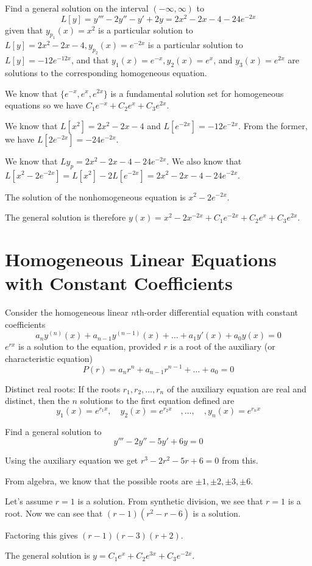 \documentclass[../diffeq.tex]{subfiles}
\begin{document}
\begin{example}
    Find a general solution on the interval $(-\infty,\infty)$ to 
    \[ L[y]=y'''-2y''-y'+2y=2x^2-2x-4-24e^{-2x}\]
    given that $y_{p_1}(x)=x^2$ is a particular solution to $L[y]=2x^2-2x-4, y_{p_2}(x)=e^{-2x}$ is a particular solution to $L[y]=-12e^{-12x}$, and that $y_1(x)=e^{-x},y_2(x)=e^x$, and $y_3(x)=e^{2x}$ are solutions to the corresponding homogeneous equation.

    We know that $\{e^{-x},e^x,e^{2x}\}$ is a fundamental solution set for homogeneous equations so we have $C_1e^{-x}+C_2e^x+C_3e^{2x}$.

    We know that $L[x^2]=2x^2-2x-4$ and $L[e^{-2x}]=-12e^{-2x}$. From the former, we have $L[2e^{-2x}]=-24e^{-2x}$.

    We know that $L{y_p}=2x^2-2x-4-24e^{-2x}$. We also know that $L[x^2-2e^{-2x}]=L[x^2]-2L[e^{-2x}]=2x^2-2x-4-24e^{-2x}$.

    The solution of the nonhomogeneous equation is $x^2-2e^{-2x}$.

    The general solution is therefore $y(x)=x^2-2x^{-2x}+C_1e^{-2x}+C_2e^x+C_3e^{2x}$.
\end{example}

\section{Homogeneous Linear Equations with Constant Coefficients}
Consider the homogeneous linear $n$th-order differential equation with constant coefficients 
\[ a_ny^{(n)}(x)+a_{n-1}y^{(n-1)}(x)+\dots + a_1y'(x)+a_0y(x)=0 \]
$e^{rx}$ is a solution to the equation, provided $r$ is a root of the auxiliary (or characteristic equation)
\[ P(r)=a_nr^n+a_{n-1}r^{n-1}+\dots+a_0 =0 \]

Distinct real roots: If the roots $r_1,r_2,\dots,r_n$ of the auxiliary equation are real and distinct, then the $n$ solutions to the first equation defined are 
\[ y_1(x)=e^{r_1x},\quad y_2(x)=e^{r_2x} \quad, \dots , \quad, y_n(x) = e^{r_nx} \]

\pagebreak
\begin{example}
    Find a general solution to 
    \[ y'''-2y''-5y'+6y=0 \]

    Using the auxiliary equation we get $r^3-2r^2-5r+6=0$ from this.

    From algebra, we know that the possible roots are $\pm 1, \pm2, \pm3, \pm 6$.

    Let's assume $r=1$ is a solution. From synthetic division, we see that $r=1$ is a root. Now we can see that $(r-1)(r^2-r-6)$ is a solution. 

    Factoring this gives $(r-1)(r-3)(r+2)$.

    The general solution is $y=C_1e^x+C_2e^{3x}+C_3e^{-2x}$.   
\end{example}
\end{document}
